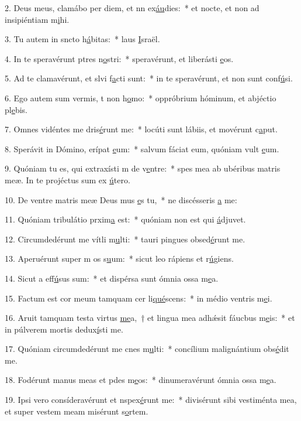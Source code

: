 2. Deus meus, clamábo per diem, et nn ex\uline{áu}dies:~* et nocte, et non ad insipiéntiam m\uline{i}hi.\par 
3. Tu autem in sncto h\uline{á}bitas:~* laus \uline{I}sraël.\par 
4. In te speravérunt ptres n\uline{o}stri:~* speravérunt, et liberásti \uline{e}os.\par 
5. Ad te clamavérunt, et slvi f\uline{a}cti sunt:~* in te speravérunt, et non sunt conf\uline{ú}si.\par 
6. Ego autem sum vermis, t non h\uline{o}mo:~* oppróbrium hóminum, et abjéctio pl\uline{e}bis.\par 
7. Omnes vidéntes me dris\uline{é}runt me:~* locúti sunt lábiis, et movérunt c\uline{a}put.\par 
8. Sperávit in Dómino, erípat \uline{e}um:~* salvum fáciat eum, quóniam vult \uline{e}um.\par 
9. Quóniam tu es, qui extraxísti m de v\uline{e}ntre:~* spes mea ab ubéribus matris meæ. In te projéctus sum ex \uline{ú}tero.\par 
10. De ventre matris meæ Deus mus \uline{e}s tu,~* ne discésseris \uline{a} me:\par 
11. Quóniam tribulátio prxim\uline{a} est:~* quóniam non est qui \uline{á}djuvet.\par 
12. Circumdedérunt me vítli m\uline{u}lti:~* tauri pingues obsed\uline{é}runt me.\par 
13. Aperuérunt super m os s\uline{u}um:~* sicut leo rápiens et r\uline{ú}giens.\par 
14. Sicut a eff\uline{ú}sus sum:~* et dispérsa sunt ómnia ossa m\uline{e}a.\par 
15. Factum est cor meum tamquam cer li\uline{qué}scens:~* in médio ventris m\uline{e}i.\par 
16. Aruit tamquam testa virtus \uline{me}a,~† et lingua mea adhǽsit fáucbus m\uline{e}is:~* et in púlverem mortis dedux\uline{í}sti me.\par 
17. Quóniam circumdedérunt me cnes m\uline{u}lti:~* concílium malignántium obs\uline{é}dit me.\par 
18. Fodérunt manus meas et pdes m\uline{e}os:~* dinumeravérunt ómnia ossa m\uline{e}a.\par 
19. Ipsi vero consíderavérunt et nspex\uline{é}runt me:~* divisérunt sibi vestiménta mea, et super vestem meam misérunt s\uline{o}rtem.\par 
